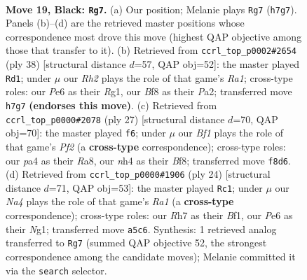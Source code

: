 \documentclass[11pt]{article}
\begin{document}
\clearpage

\begin{figure}[p]\centering
\begin{subfigure}{0.46\textwidth}\centering
\resizebox{\linewidth}{!}{%
\newchessgame
\chessboard[
  setfen={2k1rbn1/pp1b3r/4p1p1/nP1pP1Pp/P2P3N/4K3/5P2/RNB2B1R b - - 2 19},
  showmover=false,
  pgfstyle=straightmove, color=movearrow, markmove={h7-g7}
]}
\caption{}
\end{subfigure}\hfill
\begin{subfigure}{0.46\textwidth}\centering
\resizebox{\linewidth}{!}{%
\newchessgame
\chessboard[
  setfen={r1b4r/3k1pp1/p1npp3/1p4Pn/4PP2/2N1B3/PPPK4/R4BR1 w - - 0 20},
  showmover=false,
  pgfstyle=straightmove, color=movearrow, markmove={a1-d1}
]}
\caption{}
\end{subfigure}
\\[4pt]
\begin{subfigure}{0.46\textwidth}\centering
\resizebox{\linewidth}{!}{%
\newchessgame
\chessboard[
  setfen={r3kb1r/p2n1ppp/2N1p3/pBPp1b2/3P4/1P2P3/1P3PPP/R3K2R b KQkq - 0 14},
  showmover=false,
  pgfstyle=straightmove, color=movearrow, markmove={f7-f6}
]}
\caption{}
\end{subfigure}\hfill
\begin{subfigure}{0.46\textwidth}\centering
\resizebox{\linewidth}{!}{%
\newchessgame
\chessboard[
  setfen={r1b1kb1r/2p2ppp/1p6/p2Pp3/1n2P3/4BP2/PP1K2PP/R4BNR w kq - 0 13},
  showmover=false,
  pgfstyle=straightmove, color=movearrow, markmove={a1-c1}
]}
\caption{}
\end{subfigure}
\caption{\textbf{Move 19, Black: \texttt{Rg7}.} (a) Our position; Melanie plays \texttt{Rg7} (\texttt{h7g7}). Panels (b)--(d) are the retrieved master positions whose correspondence most drove this move (highest QAP objective among those that transfer to it). (b) Retrieved from \texttt{ccrl\_top\_p0002\#2654} (ply 38) [structural distance $d$=57, QAP obj=52]: the master played \texttt{Rd1}; under $\mu$ our \emph{Rh2} plays the role of that game's \emph{Ra1}; cross-type roles: our \emph{P}e6 as their \emph{R}g1, our \emph{B}f8 as their \emph{P}a2; transferred move \texttt{h7g7} \textbf{(endorses this move)}. (c) Retrieved from \texttt{ccrl\_top\_p0000\#2078} (ply 27) [structural distance $d$=70, QAP obj=70]: the master played \texttt{f6}; under $\mu$ our \emph{Bf1} plays the role of that game's \emph{Pf2} (a \textbf{cross-type} correspondence); cross-type roles: our \emph{p}a4 as their \emph{R}a8, our \emph{n}h4 as their \emph{B}f8; transferred move \texttt{f8d6}. (d) Retrieved from \texttt{ccrl\_top\_p0000\#1906} (ply 24) [structural distance $d$=71, QAP obj=53]: the master played \texttt{Rc1}; under $\mu$ our \emph{Na4} plays the role of that game's \emph{Ra1} (a \textbf{cross-type} correspondence); cross-type roles: our \emph{R}h7 as their \emph{B}f1, our \emph{P}e6 as their \emph{N}g1; transferred move \texttt{a5c6}. Synthesis: 1 retrieved analog transferred to \texttt{Rg7} (summed QAP objective 52, the strongest correspondence among the candidate moves); Melanie committed it via the \texttt{search} selector.}
\label{fig:thought-m37}
\end{figure}
\end{document}

